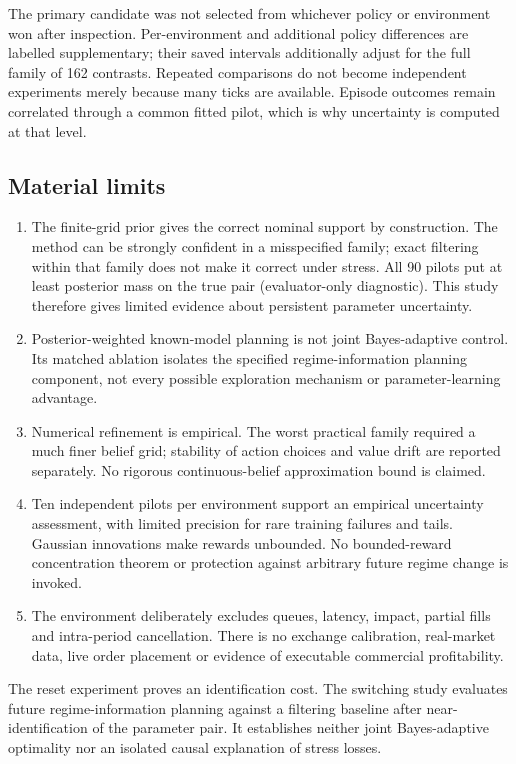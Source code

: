 \documentclass[11pt,a4paper]{article}
\begin{document}
The primary candidate was not selected from whichever policy or environment won
after inspection. Per-environment and additional policy differences are labelled
supplementary; their saved intervals additionally adjust for the full family of
162 contrasts. Repeated comparisons do not become independent experiments merely
because many ticks are available. Episode outcomes remain correlated through a
common fitted pilot, which is why uncertainty is computed at that level.

\subsection*{Material limits}
\begin{enumerate}
\item The finite-grid prior gives the correct nominal support by construction.
The method can be strongly confident in a misspecified family; exact filtering
within that family does not make it correct under stress. All 90 pilots put at
least \PilotTruthMin{} posterior mass on the true pair (evaluator-only diagnostic).
This study therefore gives limited evidence about persistent parameter uncertainty.
\item Posterior-weighted known-model planning is not joint Bayes-adaptive control.
Its matched ablation isolates the specified regime-information planning component,
not every possible exploration mechanism or parameter-learning advantage.
\item Numerical refinement is empirical. The worst practical family required a
much finer belief grid; stability of action choices and value drift are reported
separately. No rigorous continuous-belief approximation bound is claimed.
\item Ten independent pilots per environment support an empirical uncertainty
assessment, with limited precision for rare training failures and tails. Gaussian
innovations make rewards unbounded. No bounded-reward concentration theorem or
protection against arbitrary future regime change is invoked.
\item The environment deliberately excludes queues, latency, impact, partial fills
and intra-period cancellation. There is no exchange calibration, real-market data,
live order placement or evidence of executable commercial profitability.
\end{enumerate}

The reset experiment proves an identification cost. The switching study evaluates
future regime-information planning against a filtering baseline after near-identification
of the parameter pair. It establishes neither joint Bayes-adaptive optimality nor
an isolated causal explanation of stress losses.
\end{document}
